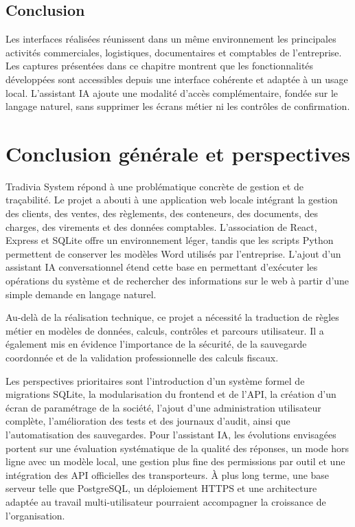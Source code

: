 \documentclass[12pt,a4paper,oneside]{report}
\begin{document}
\section*{Conclusion}

Les interfaces réalisées réunissent dans un même environnement les
principales activités commerciales, logistiques, documentaires et
comptables de l'entreprise. Les captures présentées dans ce chapitre
montrent que les fonctionnalités développées sont accessibles depuis
une interface cohérente et adaptée à un usage local. L'assistant IA
ajoute une modalité d'accès complémentaire, fondée sur le langage
naturel, sans supprimer les écrans métier ni les contrôles de
confirmation.


\chapter*{Conclusion générale et perspectives}
Tradivia System répond à une problématique concrète de gestion et de traçabilité. Le projet a abouti à une application web locale intégrant la gestion des clients, des ventes, des règlements, des conteneurs, des documents, des charges, des virements et des données comptables. L'association de React, Express et SQLite offre un environnement léger, tandis que les scripts Python permettent de conserver les modèles Word utilisés par l'entreprise. L'ajout d'un assistant IA conversationnel étend cette base en permettant d'exécuter les opérations du système et de rechercher des informations sur le web à partir d'une simple demande en langage naturel.

Au-delà de la réalisation technique, ce projet a nécessité la traduction de règles métier en modèles de données, calculs, contrôles et parcours utilisateur. Il a également mis en évidence l'importance de la sécurité, de la sauvegarde coordonnée et de la validation professionnelle des calculs fiscaux.

Les perspectives prioritaires sont l'introduction d'un système formel de migrations SQLite, la modularisation du frontend et de l'API, la création d'un écran de paramétrage de la société, l'ajout d'une administration utilisateur complète, l'amélioration des tests et des journaux d'audit, ainsi que l'automatisation des sauvegardes. Pour l'assistant IA, les évolutions envisagées portent sur une évaluation systématique de la qualité des réponses, un mode hors ligne avec un modèle local, une gestion plus fine des permissions par outil et une intégration des API officielles des transporteurs. À plus long terme, une base serveur telle que PostgreSQL, un déploiement HTTPS et une architecture adaptée au travail multi-utilisateur pourraient accompagner la croissance de l'organisation.
\end{document}
